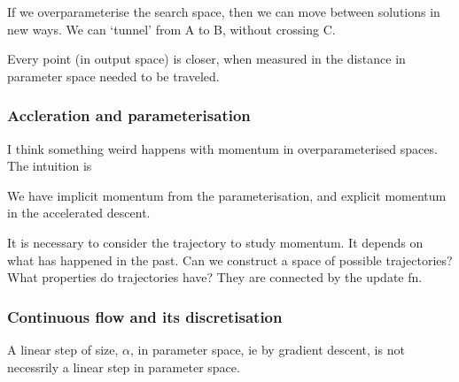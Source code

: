 If we overparameterise the search space, then we can move between solutions in new ways. We can `tunnel' from A to B, without crossing C.

Every point (in output space) is closer, when measured in the distance in parameter space needed to be traveled.


\subsubsection{Accleration and parameterisation}

I think something weird happens with momentum in overparameterised spaces. The intuition is

We have implicit momentum from the parameterisation, and explicit momentum in the accelerated descent.

It is necessary to consider the trajectory to study momentum. It depends
on what has happened in the past. Can we construct a space of possible
trajectories? What properties do trajectories have? They are connected
by the update fn.


\subsubsection{Continuous flow and its discretisation}

A linear step of size, \(\alpha\), in parameter space, ie by gradient
descent, is not necessrily a linear step in parameter space.

